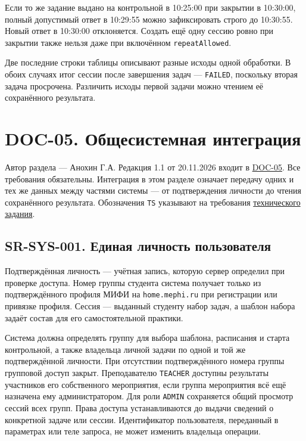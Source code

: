 \documentclass[12pt,a4paper]{article}
\begin{document}
Если то же задание выдано на контрольной в 10:25:00 при закрытии в 10:30:00, полный допустимый ответ в 10:29:55 можно зафиксировать строго до 10:30:55. Новый ответ в 10:30:00 отклоняется. Создать ещё одну сессию ровно при закрытии также нельзя даже при включённом \texttt{repeatAllowed}.

Две последние строки таблицы описывают разные исходы одной обработки. В обоих случаях итог сессии после завершения задач --- \texttt{FAILED}, поскольку вторая задача просрочена. Различить исходы первой задачи можно чтением её сохранённого результата.

\section{DOC-05. Общесистемная интеграция}\label{doc-05-ux43eux431ux449ux435ux441ux438ux441ux442ux435ux43cux43dux430ux44f-ux438ux43dux442ux435ux433ux440ux430ux446ux438ux44f}

\hypertarget{doc-05-общесистемная-интеграция}{}

Автор раздела --- Анохин Г.А. Редакция 1.1 от 20.11.2026 входит в {\hyperlink{doc-05-системные-требования}{DOC-05}}. Все требования обязательны. Интеграция в этом разделе означает передачу одних и тех же данных между частями системы --- от подтверждения личности до чтения сохранённого результата. Обозначения \texttt{TS} указывают на требования {\href{../02\_Техническое\_задание/Техническое\_задание.pdf\#doc-02-техническое-задание}{технического задания}}.

\subsection{SR-SYS-001. Единая личность пользователя}\label{sr-sys-001-ux435ux434ux438ux43dux430ux44f-ux43bux438ux447ux43dux43eux441ux442ux44c-ux43fux43eux43bux44cux437ux43eux432ux430ux442ux435ux43bux44f}

\hypertarget{sr-sys-001-единая-личность-пользователя}{}

\hypertarget{sr-sys-001}{}

Подтверждённая личность --- учётная запись, которую сервер определил при проверке доступа. Номер группы студента система получает только из подтверждённого профиля МИФИ на \texttt{home.\allowbreak{}mephi.\allowbreak{}ru} при регистрации или привязке профиля. Сессия --- выданный студенту набор задач, а шаблон набора задаёт состав для его самостоятельной практики.

Система должна определять группу для выбора шаблона, расписания и старта контрольной, а также владельца личной задачи по одной и той же подтверждённой личности. При отсутствии подтверждённого номера группы групповой доступ закрыт. Преподавателю \texttt{TEACHER} доступны результаты участников его собственного мероприятия, если группа мероприятия всё ещё назначена ему администратором. Для роли \texttt{ADMIN} сохраняется общий просмотр сессий всех групп. Права доступа устанавливаются до выдачи сведений о конкретной задаче или сессии. Идентификатор пользователя, переданный в параметрах или теле запроса, не может изменить владельца операции.
\end{document}
